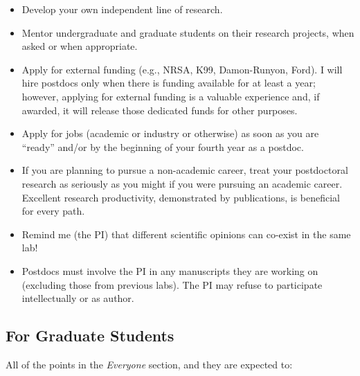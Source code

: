 \documentclass[
]{book}
\providecommand{\tightlist}{%
  \setlength{\itemsep}{0pt}\setlength{\parskip}{0pt}}
\begin{document}
\begin{itemize}
\tightlist
\item
  Develop your own independent line of research.
\item
  Mentor undergraduate and graduate students on their research projects, when asked or when appropriate.
\item
  Apply for external funding (e.g., NRSA, K99, Damon-Runyon, Ford). I will hire postdocs only when there is funding available for at least a year; however, applying for external funding is a valuable experience and, if awarded, it will release those dedicated funds for other purposes.
\item
  Apply for jobs (academic or industry or otherwise) as soon as you are ``ready'' and/or by the beginning of your fourth year as a postdoc.
\item
  If you are planning to pursue a non-academic career, treat your postdoctoral research as seriously as you might if you were pursuing an academic career. Excellent research productivity, demonstrated by publications, is beneficial for every path.
\item
  Remind me (the PI) that different scientific opinions can co-exist in the same lab!
\item
  Postdocs must involve the PI in any manuscripts they are working on (excluding those from previous labs). The PI may refuse to participate intellectually or as author.
\end{itemize}

\hypertarget{for-graduate-students}{%
\subsection{For Graduate Students}\label{for-graduate-students}}

All of the points in the \emph{Everyone} section, and they are expected to:
\end{document}
